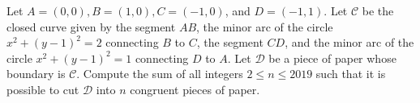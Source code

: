 Let $A=(0,0), B=(1,0), C = (-1,0)$, and $D = (-1,1)$. Let $\mathcal C$ be the closed curve given by the segment $AB$, the minor arc of the circle $x^2 + (y-1)^2 = 2$ connecting $B$ to $C$, the segment $CD$, and the minor arc of the circle $x^2 + (y-1)^2=1$ connecting $D$ to $A$. Let $\mathcal D$ be a piece of paper whose boundary is $\mathcal C$. Compute the sum of all integers $2\le n\le 2019$ such that it is possible to cut $\mathcal D$ into $n$ congruent pieces of paper.
